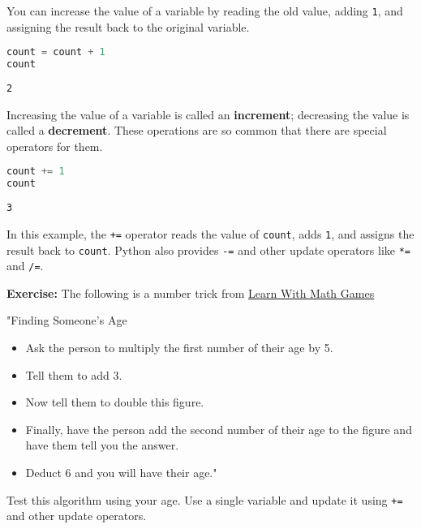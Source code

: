 You can increase the value of a variable by reading the old value,
adding \passthrough{\lstinline!1!}, and assigning the result back to the
original variable.

\begin{lstlisting}[language=Python,style=source]
count = count + 1
count
\end{lstlisting}

\begin{lstlisting}[style=output]
2
\end{lstlisting}

Increasing the value of a variable is called an \textbf{increment};
decreasing the value is called a \textbf{decrement}. These operations
are so common that there are special operators for them.

\begin{lstlisting}[language=Python,style=source]
count += 1
count
\end{lstlisting}

\begin{lstlisting}[style=output]
3
\end{lstlisting}

In this example, the \passthrough{\lstinline!+=!} operator reads the
value of \passthrough{\lstinline!count!}, adds
\passthrough{\lstinline!1!}, and assigns the result back to
\passthrough{\lstinline!count!}. Python also provides
\passthrough{\lstinline!-=!} and other update operators like
\passthrough{\lstinline!*=!} and \passthrough{\lstinline!/=!}.

\textbf{Exercise:} The following is a number trick from
\href{https://www.learn-with-math-games.com/math-number-tricks.html}{Learn
With Math Games}

"Finding Someone's Age

\begin{itemize}
\item
  Ask the person to multiply the first number of their age by 5.
\item
  Tell them to add 3.
\item
  Now tell them to double this figure.
\item
  Finally, have the person add the second number of their age to the
  figure and have them tell you the answer.
\item
  Deduct 6 and you will have their age."
\end{itemize}

Test this algorithm using your age. Use a single variable and update it
using \passthrough{\lstinline!+=!} and other update operators.

